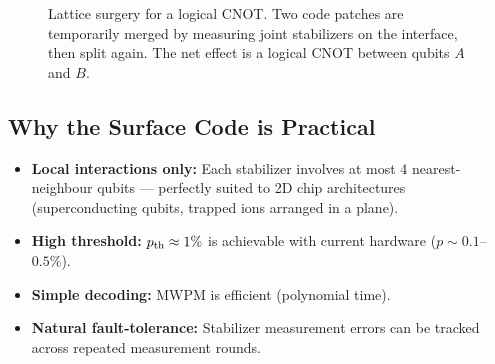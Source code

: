 \documentclass[11pt, a4paper]{article}
\theoremstyle{definition}
\theoremstyle{plain}
\theoremstyle{remark}
\begin{document}
\begin{figure}[H]
\centering
{}
\caption{Lattice surgery for a logical CNOT.  Two code patches are
temporarily merged by measuring joint stabilizers on the interface, then
split again.  The net effect is a logical CNOT between qubits $A$ and $B$.}
\label{fig:lattice-surgery}
\end{figure}

\subsection{Why the Surface Code is Practical}

\begin{itemize}
  \item \textbf{Local interactions only:} Each stabilizer involves at most
        4 nearest-neighbour qubits --- perfectly suited to 2D chip architectures
        (superconducting qubits, trapped ions arranged in a plane).
  \item \textbf{High threshold:} $p_{\rm th} \approx 1\%$ is achievable with
        current hardware ($p \sim 0.1$--$0.5\%$).
  \item \textbf{Simple decoding:} MWPM is efficient (polynomial time).
  \item \textbf{Natural fault-tolerance:} Stabilizer measurement errors can
        be tracked across repeated measurement rounds.
\end{itemize}
\end{document}
